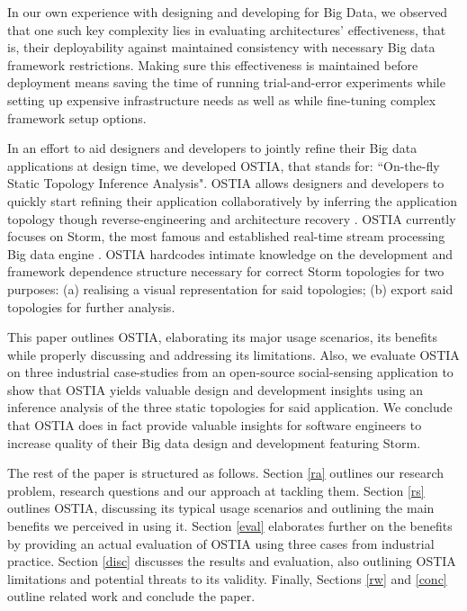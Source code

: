 In our own experience with designing and developing for Big Data, we observed that one such key complexity lies in evaluating architectures' effectiveness, that is, their deployability against maintained consistency with necessary Big data framework restrictions. Making sure this effectiveness is maintained before deployment means saving the time of running trial-and-error experiments while setting up expensive infrastructure needs as well as while fine-tuning complex framework setup options.

In an effort to aid designers and developers to jointly refine their Big data applications at design time, we developed OSTIA, that stands for: ``On-the-fly Static Topology Inference Analysis". OSTIA allows designers and developers to quickly start refining their application collaboratively by inferring the application topology though reverse-engineering and architecture recovery \cite{archrec}. OSTIA currently focuses on Storm, the most famous and established real-time stream processing Big data engine \cite{storm}. OSTIA hardcodes intimate knowledge on the development and framework dependence structure necessary for correct Storm topologies for two purposes: (a) realising a visual representation for said topologies; (b) export said topologies for further analysis.

This paper outlines OSTIA, elaborating its major usage scenarios, its benefits while properly discussing and addressing its limitations. Also, we evaluate OSTIA on three industrial case-studies from an open-source social-sensing application to show that OSTIA yields valuable design and development insights using an inference analysis of the three static topologies for said application. We conclude that OSTIA does in fact provide valuable insights for software engineers to increase quality of their Big data design and development featuring Storm.

The rest of the paper is structured as follows. Section \ref{ra} outlines our research problem, research questions and our approach at tackling them. Section \ref{rs} outlines OSTIA, discussing its typical usage scenarios and outlining the main benefits we perceived in using it. Section \ref{eval} elaborates further on the benefits by providing an actual evaluation of OSTIA using three cases from industrial practice. Section \ref{disc} discusses the results and evaluation, also outlining OSTIA limitations and potential threats to its validity. Finally, Sections \ref{rw} and \ref{conc} outline related work and conclude the paper.